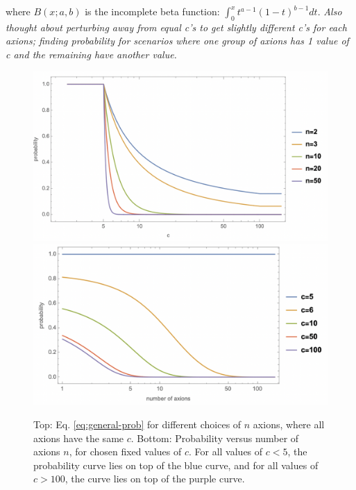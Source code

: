 \documentclass[11pt]{article}
\begin{document}
\noindent where $B(x;a,b)$ is the incomplete beta function: $\int_0^x t^{a-1}(1-t)^{b-1} dt$.
\emph{Also thought about perturbing away from equal c's to get slightly different c's for each axions; finding probability for scenarios where one group of axions has 1 value of c and the remaining have another value.}

\begin{figure}[h]
    \includegraphics[scale=0.45]{figs/naxions-equalC.png}
    \includegraphics[scale=0.5]{figs/naxions-equalC-vsN.png}
    \centering
    \caption{Top: Eq. \eqref{eq:general-prob} for different choices of $n$ axions, where all axions have the same $c$. Bottom: Probability versus number of axions $n$, for chosen fixed values of $c$. For all values of $c<5$, the probability curve lies on top of the blue curve, and for all values of $c>100$, the curve lies on top of the purple curve.}
    \label{fig:n-prob-equalC}
\end{figure}

\break
\end{document}
